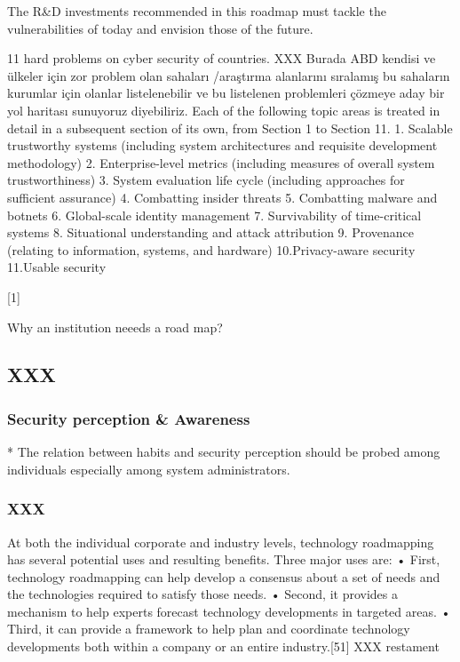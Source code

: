 \documentclass[journal]{IEEEtran}
\begin{document}
The R\&D investments recommended in this roadmap must tackle the vulnerabilities of today and envision those of the future.

11 hard problems on cyber security of countries.
XXX Burada ABD kendisi ve ülkeler için zor problem olan sahaları /araştırma alanlarını sıralamış bu sahaların kurumlar için olanlar listelenebilir ve bu listelenen problemleri çözmeye aday bir yol haritası sunuyoruz diyebiliriz.
Each of the following topic areas is treated in detail in a subsequent section of its own, from Section 1 to Section 11.
1. Scalable trustworthy systems (including system architectures and requisite development methodology)
2. Enterprise-level metrics (including measures of overall system trustworthiness)
3. System evaluation life cycle (including approaches for sufficient assurance)
4. Combatting insider threats
5. Combatting malware and botnets
6. Global-scale identity management
7. Survivability of time-critical systems
8. Situational understanding and attack attribution
9. Provenance (relating to information, systems, and hardware)
10.Privacy-aware security
11.Usable security

 [1]

Why an institution neeeds a road map?

\subsection{XXX}

\subsubsection{Security perception \& Awareness}
* The relation between habits and security perception should be probed among individuals especially among system administrators.
\subsubsection{XXX}
At both the individual corporate and industry levels, technology roadmapping has
several potential uses and resulting benefits. Three major uses are:
• First, technology roadmapping can help develop a consensus about a set of needs and
the technologies required to satisfy those needs.
• Second, it provides a mechanism to help experts forecast technology developments in
targeted areas.
• Third, it can provide a framework to help plan and coordinate technology
developments both within a company or an entire industry.[51] XXX  restament
\end{document}
